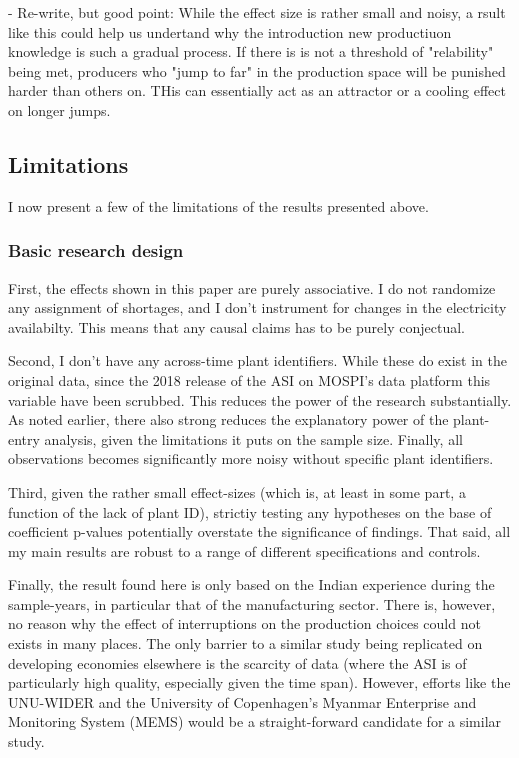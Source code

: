 \documentclass[11pt]{article}
\begin{document}
- Re-write, but good point: While the effect size is rather small and noisy, a rsult like this could help us undertand why the introduction new productiuon knowledge is such a gradual process. If there is is not a threshold of "relability" being met, producers who "jump to far" in the production space will be punished harder than others on. THis can essentially act as an attractor or a cooling effect on longer jumps.

\subsection{Limitations}
\label{sec:org979560b}
I now present a few of the limitations of the results presented above. 

\subsubsection{Basic research design}
First, the effects shown in this paper are purely associative. I do not randomize any assignment of shortages, and I don't instrument for changes in the electricity availabilty. This means that any causal claims has to be purely conjectual.

Second, I don't have any across-time plant identifiers. While these do exist in the original data, since the 2018 release of the ASI on MOSPI's data platform this variable have been scrubbed. This reduces the power of the research substantially. As noted earlier, there also strong reduces the explanatory power of the plant-entry analysis, given the limitations it puts on the sample size. Finally, all observations becomes significantly more noisy without specific plant identifiers. 

Third, given the rather small effect-sizes (which is, at least in some part, a function of the lack of plant ID), strictiy testing any hypotheses on the base of coefficient p-values potentially overstate the significance of findings. That said, all my main results are robust to a range of different specifications and controls.

Finally, the result found here is only based on the Indian experience during the sample-years, in particular that of the manufacturing sector. There is, however, no reason why the effect of interruptions on the production choices could not exists in many places. The only barrier to a similar study being replicated on developing economies elsewhere is the scarcity of data (where the ASI is of particularly high quality, especially given the time span). However, efforts like the UNU-WIDER and the University of Copenhagen's Myanmar Enterprise and Monitoring System (MEMS) would be a straight-forward candidate for a similar study.
\end{document}
